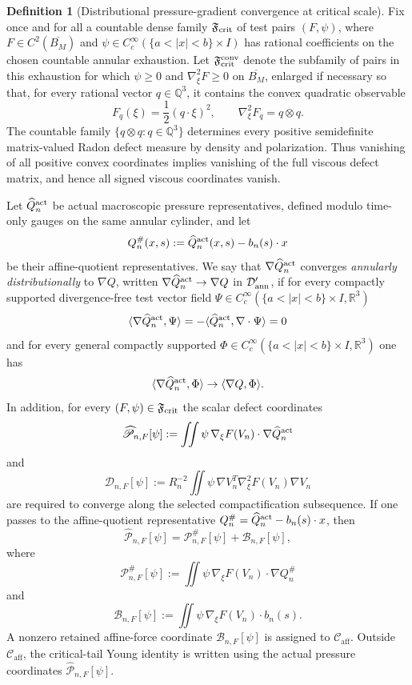 \documentclass[11pt]{amsart}
\numberwithin{equation}{section}
\theoremstyle{plain}
\theoremstyle{definition}
\newtheorem{definition}[definition]{Definition}
\theoremstyle{remark}
\newcommand{\Caff}{\mathcal C_{\mathrm{aff}}}
\begin{document}
\begin{definition}[Distributional pressure-gradient convergence at critical scale]
\label{def:critical-pressure-gradient-convergence}
Fix once and for all a countable dense family \(\mathfrak F_{\rm crit}\) of test
pairs \((F,\psi)\), where \(F\in C^2(\overline{B_M})\) and
\(\psi\in C_c^\infty(\{a<|x|<b\}\times I)\) has rational coefficients on the
chosen countable annular exhaustion.  Let \(\mathfrak F_{\rm crit}^{\rm conv}\)
denote the subfamily of pairs in this exhaustion for which
\(\psi\ge0\) and \(\nabla_\xi^2F\ge0\) on \(\overline{B_M}\), enlarged if necessary
so that, for every rational vector \(q\in\mathbb Q^3\), it contains the convex
quadratic observable
\[
   F_q(\xi)=\frac12(q\cdot\xi)^2,
   \qquad
   \nabla_\xi^2F_q=q\otimes q .
\]
The countable family \(\{q\otimes q:q\in\mathbb Q^3\}\) determines every positive
semidefinite matrix-valued Radon defect measure by density and polarization.
Thus vanishing of all positive convex coordinates implies vanishing of the full
viscous defect matrix, and hence all signed viscous coordinates vanish.

Let \(\widehat Q_n^{\rm act}\) be actual macroscopic pressure representatives,
defined modulo time-only gauges on the same annular cylinder, and let
\[
   Q_n^\#(x,s):=\widehat Q_n^{\rm act}(x,s)-b_n(s)\cdot x
\]
be their affine-quotient representatives.  We say that
\(\nabla\widehat Q_n^{\rm act}\) converges \emph{annularly distributionally}
to \(\nabla Q\), written
\(\nabla\widehat Q_n^{\rm act}\to\nabla Q\) in \(\mathcal D'_{\rm ann}\), if
for every compactly supported divergence-free test vector field
\(\Psi\in C_c^\infty(\{a<|x|<b\}\times I,\mathbb R^3)\)
\[
   \langle\nabla\widehat Q_n^{\rm act},\Psi\rangle
   =-\langle\widehat Q_n^{\rm act},\nabla\cdot\Psi\rangle
   =0
\]
and for every general compactly supported \(\Phi\in C_c^\infty(\{a<|x|<b\}\times
I,\mathbb R^3)\) one has
\[
   \langle\nabla\widehat Q_n^{\rm act},\Phi\rangle
   \to\langle\nabla Q,\Phi\rangle .
\]
In addition, for every \((F,\psi)\in\mathfrak F_{\rm crit}\) the scalar defect
coordinates
\[
   \widehat{\mathscr P}_{n,F}[\psi]
   :=
   \iint \psi\,\nabla_\xi F(V_n)\cdot\nabla\widehat Q_n^{\rm act}
\]
and
\[
   \mathscr D_{n,F}[\psi]
   :=
   R_n^{-2}\iint
   \psi\,\nabla V_n^T\nabla_\xi^2F(V_n)\nabla V_n
\]
are required to converge along the selected compactification subsequence.  If
one passes to the affine-quotient representative
\(Q_n^\#=\widehat Q_n^{\rm act}-b_n(s)\cdot x\), then
\[
   \widehat{\mathscr P}_{n,F}[\psi]
   =
   \mathscr P^\#_{n,F}[\psi]+\mathscr B_{n,F}[\psi],
\]
where
\[
   \mathscr P^\#_{n,F}[\psi]
   :=
   \iint \psi\,\nabla_\xi F(V_n)\cdot\nabla Q_n^\#
\]
and
\[
   \mathscr B_{n,F}[\psi]
   :=
   \iint \psi\,\nabla_\xi F(V_n)\cdot b_n(s).
\]
A nonzero retained affine-force coordinate \(\mathscr B_{n,F}[\psi]\) is
assigned to \(\Caff\).  Outside \(\Caff\), the critical-tail Young identity is
written using the actual pressure coordinates
\(\widehat{\mathscr P}_{n,F}[\psi]\).
\end{definition}
\end{document}
